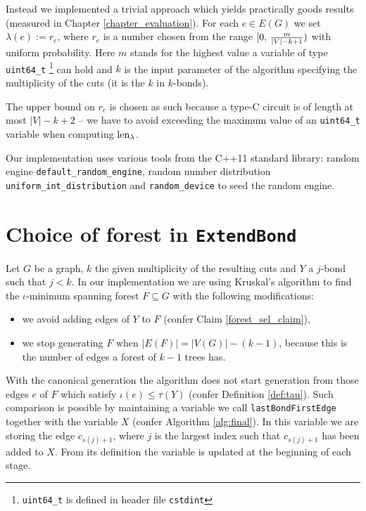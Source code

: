 Instead we implemented a trivial approach which yields practically goods results (measured in Chapter \ref{chapter_evaluation}). For each $e \in E(G)$ we set $\lambda(e) := r_e$, where $r_e$ is a number chosen from the range $[0, \, { {m}\over{|V| - k + 1} } )$ with uniform probability. Here $m$ stands for the highest value a variable of type \lstinline|uint64_t| \footnote{\lstinline|uint64_t| is defined in header file \lstinline|cstdint|} can hold and $k$ is the input parameter of the algorithm specifying the multiplicity of the cuts (it is the $k$ in $k$-bonds).

The upper bound on $r_e$ is chosen as such because a type-C circuit is of length at most $\lvert V \rvert - k + 2$ -- we have to avoid exceeding the maximum value of an \lstinline|uint64_t| variable when computing $\operatorname{len}_\lambda$.

Our implementation uses various tools from the C++11 standard library: random engine \lstinline|default_random_engine|, random number distribution \lstinline|uniform_int_distribution| and \lstinline|random_device| to seed the \linebreak random engine.


\section{Choice of forest in \lstinline|ExtendBond|}

Let $G$ be a graph, $k$ the given multiplicity of the resulting cuts and $Y$ a $j$-bond such that $j < k$. In our implementation we are using Kruskal's algorithm to find the $\iota$-minimum spanning forest $F \subseteq G$ with the following modifications:

\begin{itemize}
	\item we avoid adding edges of $Y$ to $F$ (confer Claim \ref{forest_sel_claim}),
	\item we stop generating $F$ when $\lvert E(F) \rvert = |V(G)| - (k - 1)$, because this is the number of edges a forest of $k - 1$ trees has.
\end{itemize}

With the canonical generation the algorithm does not start generation from those edges $e$ of $F$ which satisfy $\iota(e) \leq \tau(Y)$ (confer Definition \ref{def:tau}). Such comparison is possible by maintaining a variable we call \lstinline|lastBondFirstEdge| together with the variable $X$ (confer Algorithm \ref{alg:final}). In this variable we are storing the edge $c_{s(j)+1}$, where $j$ is the largest index such that $c_{s(j)+1}$ has been added to $X$. From its definition the variable is updated at the beginning of each stage.

